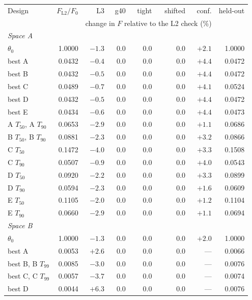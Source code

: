 \begin{tabular}{lrrrrrrr}\toprule
Design & $F_{\mathrm{L2}}/F_0$ & L3 & g40 & tight & shifted & conf. & held-out\\
 & & \multicolumn{5}{c}{change in $F$ relative to the L2 check (\%)} & \\\midrule
\multicolumn{8}{l}{\emph{Space A}}\\
$\theta_0$ & 1.0000 & $-1.3$ & $0.0$ & $0.0$ & $0.0$ & $+2.1$ & 1.0000\\
best A & 0.0432 & $-0.4$ & $0.0$ & $0.0$ & $0.0$ & $+4.4$ & 0.0472\\
best B & 0.0432 & $-0.5$ & $0.0$ & $0.0$ & $0.0$ & $+4.4$ & 0.0472\\
best C & 0.0489 & $-0.7$ & $0.0$ & $0.0$ & $0.0$ & $+4.1$ & 0.0524\\
best D & 0.0432 & $-0.5$ & $0.0$ & $0.0$ & $0.0$ & $+4.4$ & 0.0472\\
best E & 0.0434 & $-0.6$ & $0.0$ & $0.0$ & $0.0$ & $+4.4$ & 0.0473\\
A $T_{50}$, A $T_{90}$ & 0.0653 & $-2.9$ & $0.0$ & $0.0$ & $0.0$ & $+1.1$ & 0.0686\\
B $T_{50}$, B $T_{90}$ & 0.0881 & $-2.3$ & $0.0$ & $0.0$ & $0.0$ & $+3.2$ & 0.0866\\
C $T_{50}$ & 0.1472 & $-4.0$ & $0.0$ & $0.0$ & $0.0$ & $+3.3$ & 0.1508\\
C $T_{90}$ & 0.0507 & $-0.9$ & $0.0$ & $0.0$ & $0.0$ & $+4.0$ & 0.0543\\
D $T_{50}$ & 0.0920 & $-2.2$ & $0.0$ & $0.0$ & $0.0$ & $+3.3$ & 0.0899\\
D $T_{90}$ & 0.0594 & $-2.3$ & $0.0$ & $0.0$ & $0.0$ & $+1.6$ & 0.0609\\
E $T_{50}$ & 0.1105 & $-2.0$ & $0.0$ & $0.0$ & $0.0$ & $+1.2$ & 0.1104\\
E $T_{90}$ & 0.0660 & $-2.9$ & $0.0$ & $0.0$ & $0.0$ & $+1.1$ & 0.0694\\
\multicolumn{8}{l}{\emph{Space B}}\\
$\theta_0$ & 1.0000 & $-1.3$ & $0.0$ & $0.0$ & $0.0$ & $+2.0$ & 1.0000\\
best A & 0.0053 & $+2.6$ & $0.0$ & $0.0$ & $0.0$ & --- & 0.0066\\
best B, B $T_{99}$ & 0.0085 & $-3.0$ & $0.0$ & $0.0$ & $0.0$ & --- & 0.0076\\
best C, C $T_{99}$ & 0.0057 & $-3.7$ & $0.0$ & $0.0$ & $0.0$ & --- & 0.0074\\
best D & 0.0044 & $+6.3$ & $0.0$ & $0.0$ & $0.0$ & --- & 0.0076\\

\end{tabular}

